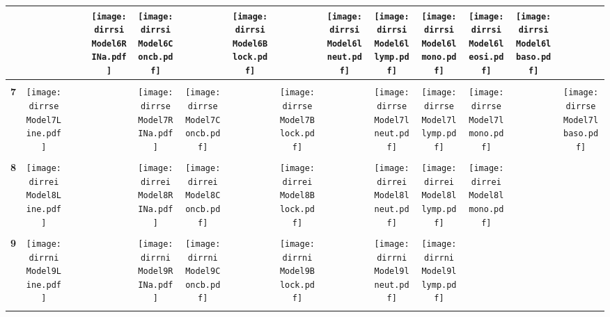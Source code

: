 \documentclass[landscape]{article}
\def \dirrsi{U:/R/RA/Data/RFI-newdata/resultsimulation/pvalue05/Model6.Line.Concb.RINa.lneut.llymp.lmono.leosi.lbaso.Block/}
\def \dirrse{U:/R/RA/Data/RFI-newdata/resultsimulation/pvalue05/Model7.Line.Concb.RINa.lneut.llymp.lmono.lbaso.Block/}
\def \dirrei{U:/R/RA/Data/RFI-newdata/resultsimulation/pvalue05/Model8.Line.Concb.RINa.lneut.llymp.lmono.Block/}
\def \dirrni{U:/R/RA/Data/RFI-newdata/resultsimulation/pvalue05/Model9.Line.Concb.RINa.lneut.llymp.Block/}
\begin{document}
\begin{table}
\begin{tabular}{ccccccccccccccc}
      &
      &
      &
      &\texttt{[image: \\dirrsi Model6RINa.pdf]}
      &\texttt{[image: \\dirrsi Model6Concb.pdf]}
      &
      &\texttt{[image: \\dirrsi Model6Block.pdf]}
      &
      &\texttt{[image: \\dirrsi Model6lneut.pdf]}
      &\texttt{[image: \\dirrsi Model6llymp.pdf]}
      &\texttt{[image: \\dirrsi Model6lmono.pdf]}
      &\texttt{[image: \\dirrsi Model6leosi.pdf]}
      &\texttt{[image: \\dirrsi Model6lbaso.pdf]}
     \\[3.5pt]
     \hline
     \\[3.5pt]
     {\Huge \textbf{7}} 
      &\texttt{[image: \\dirrse Model7Line.pdf]}
      &
      &
      &
      &\texttt{[image: \\dirrse Model7RINa.pdf]}
      &\texttt{[image: \\dirrse Model7Concb.pdf]}
      &
      &\texttt{[image: \\dirrse Model7Block.pdf]}
      &
      &\texttt{[image: \\dirrse Model7lneut.pdf]}
      &\texttt{[image: \\dirrse Model7llymp.pdf]}
      &\texttt{[image: \\dirrse Model7lmono.pdf]}
      &
      &\texttt{[image: \\dirrse Model7lbaso.pdf]}
     \\[3.5pt]
     \hline
     \\[3.5pt]

     {\Huge \textbf{8}} 
      &\texttt{[image: \\dirrei Model8Line.pdf]}
      &
      &
      &
      &\texttt{[image: \\dirrei Model8RINa.pdf]}
      &\texttt{[image: \\dirrei Model8Concb.pdf]}
      &
      &\texttt{[image: \\dirrei Model8Block.pdf]}
      &
      &\texttt{[image: \\dirrei Model8lneut.pdf]}
      &\texttt{[image: \\dirrei Model8llymp.pdf]}
      &\texttt{[image: \\dirrei Model8lmono.pdf]}
      &
      &
     \\[3.5pt]
     \hline
     \\[3.5pt]
     
     {\Huge \textbf{9}} 
      &\texttt{[image: \\dirrni Model9Line.pdf]}
      &
      &
      &
      &\texttt{[image: \\dirrni Model9RINa.pdf]}
      &\texttt{[image: \\dirrni Model9Concb.pdf]}
      &
      &\texttt{[image: \\dirrni Model9Block.pdf]}
      &
      &\texttt{[image: \\dirrni Model9lneut.pdf]}
      &\texttt{[image: \\dirrni Model9llymp.pdf]}
      &
      &
      &
     \\[3.5pt]
     \hline
     \\[3.5pt]
     
\end{tabular}
\end{table}
\end{document}
